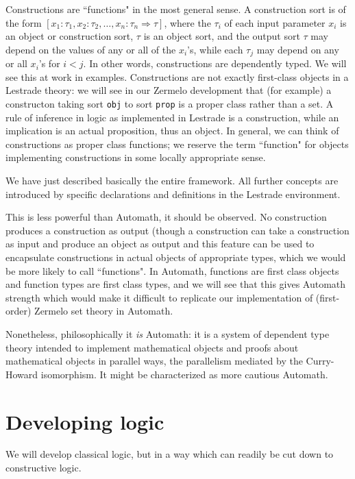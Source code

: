 \documentclass[12pt]{article}
\begin{document}
Constructions are ``functions" in the most general sense.  A construction sort is of the form $[x_1:\tau_1,x_2:\tau_2,\ldots,x_n:\tau_n \Rightarrow \tau]$, where the $\tau_i$ of each input parameter $x_i$  is an object or construction sort, $\tau$ is an object sort, and the output sort $\tau$ may depend on the values of any or all of the $x_i$'s, while each $\tau_j$ may depend on any or all $x_i$'s for $i<j$.  In other words, constructions are dependently typed.  We will see this at work in examples.  Constructions are not exactly first-class objects in a Lestrade theory:  we will see in our Zermelo development that (for example) a constructon taking sort {\tt obj} to sort {\tt prop} is a proper class rather than a set.   A rule of inference in logic as implemented in Lestrade is a construction, while an implication is an actual proposition, thus an object.  In general, we can think of constructions as proper class functions;  we reserve the term ``function" for objects implementing constructions in some locally appropriate sense.

We have just described basically the entire framework.  All further concepts are introduced by specific declarations and definitions in the Lestrade environment.

This is less powerful than Automath, it should be observed.  No construction produces a construction as output (though a construction can take a construction as input and produce an object as output and this feature can be used to encapsulate constructions in actual objects of appropriate types, which we would be more likely to call ``functions".  In Automath, functions are first class objects and function types are first class types, and we will see that this gives Automath strength which would make it difficult to replicate our implementation of (first-order) Zermelo set theory in Automath.

Nonetheless, philosophically it {\em is\/} Automath:  it is a system of dependent type theory intended to implement mathematical objects and proofs about mathematical objects in parallel ways, the parallelism mediated by the Curry-Howard isomorphism.   It might be characterized as more cautious Automath.



\section{Developing logic}

We will develop classical logic, but in a way which can readily be cut down to constructive logic.
\end{document}
